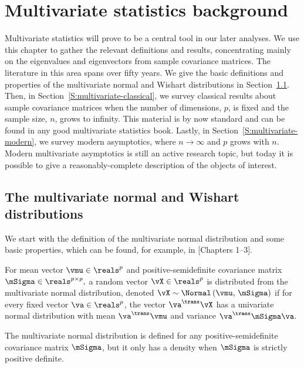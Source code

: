 
\chapter{Multivariate statistics background}

Multivariate statistics will prove to be a central tool in our later analyses.  We use this chapter to gather the relevant definitions and results, concentrating mainly on the eigenvalues and eigenvectors from sample covariance matrices.  The literature in this area spans over fifty years.  We give the basic definitions and properties of the multivariate normal and Wishart distributions in Section~\ref{S:mulitivariate-definitions}.  Then, in Section~\ref{S:multivariate-classical}, we survey classical results about sample covariance matrices when the number of dimensions, $p$, is fixed and the sample size, $n$, grows to infinity.  This material is by now standard and can be found in any good multivariate statistics book.  Lastly,  in Section~\ref{S:multivariate-modern}, we survey modern asymptotics, where $n \to \infty$ and $p$ grows with $n$.  Modern multivariate asymptotics is still an active research topic, but today it is possible to give a reasonably-complete description of the objects of interest.

\section{The multivariate normal and Wishart distributions}\label{S:mulitivariate-definitions}

We start with the definition of the multivariate normal distribution and some basic properties, which can be found, for example, in \cite{muirhead1982ams}[Chapters 1--3].

\begin{definition}
    \label{D:multivariate-normal}
For mean vector 
\(
    \vmu \in \reals^p
\)
and positive-semidefinite covariance matrix
\(
    \mSigma \in \reals^{p\times p},
\)
a random vector 
\(
    \vX \in \reals^p
\)
is distributed from the multivariate normal distribution, denoted 
\(
    \vX 
    \sim 
    \Normal \left(
        \vmu, \,
        \mSigma
    \right)
\)
if for every fixed vector $\va \in \reals^p$, the vector
$\va^\trans \vX$ has a univariate normal distribution with mean
\(
    \va^\trans \vmu
\)
and variance
\(
    \va^\trans \mSigma \va
\).
\end{definition}

\noindent
The multivariate normal distribution is defined for any positive-semidefinite covariance matrix $\mSigma$, but it only has a density when $\mSigma$ is strictly positive definite.


